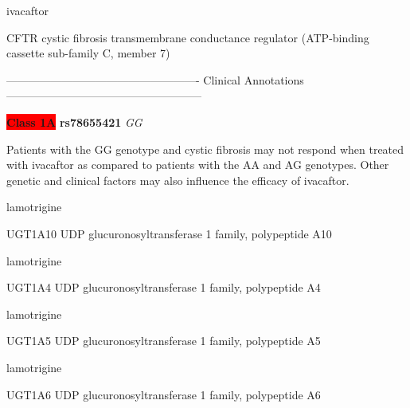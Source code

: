 \documentclass{resume} %
\begin{document}
\begin{rSection}{ ivacaftor }
\begin{rSubsection}{ CFTR }{ cystic fibrosis transmembrane conductance regulator (ATP-binding cassette sub-family C, member 7) }{}{}
\item[] ---------------------------------------------------- Clinical Annotations -----------------------------------------------------\newline
\item \textbf{\colorbox{red} {Class 1A}} \textbf{ rs78655421 } \textit{ GG }
\item[] Patients with the GG genotype and cystic fibrosis may not respond when treated with ivacaftor as compared to patients with the AA and AG genotypes. Other genetic and clinical factors may also influence the efficacy of ivacaftor.

\end{rSubsection}

\end{rSection}\begin{rSection}{ lamotrigine }
\item[]
\begin{rSubsection}{ UGT1A10 }{ UDP glucuronosyltransferase 1 family, polypeptide A10 }{}{}
\item[]


\end{rSubsection}

\end{rSection}\begin{rSection}{ lamotrigine }
\item[]
\begin{rSubsection}{ UGT1A4 }{ UDP glucuronosyltransferase 1 family, polypeptide A4 }{}{}
\item[]


\end{rSubsection}

\end{rSection}\begin{rSection}{ lamotrigine }
\item[]
\begin{rSubsection}{ UGT1A5 }{ UDP glucuronosyltransferase 1 family, polypeptide A5 }{}{}
\item[]


\end{rSubsection}

\end{rSection}\begin{rSection}{ lamotrigine }
\item[]
\begin{rSubsection}{ UGT1A6 }{ UDP glucuronosyltransferase 1 family, polypeptide A6 }{}{}
\item[]



\end{rSubsection}
\end{rSection}
\end{document}
